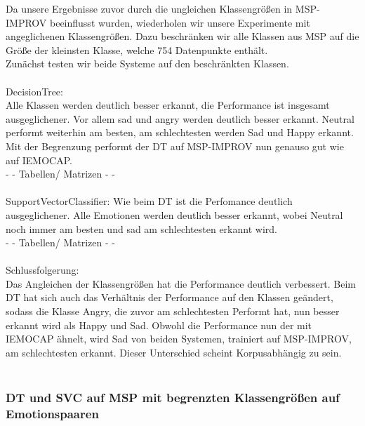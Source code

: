 \documentclass{article} %
\begin{document}
Da unsere Ergebnisse zuvor durch die ungleichen Klassengrößen in MSP-IMPROV beeinflusst wurden, wiederholen wir unsere Experimente mit angeglichenen Klassengrößen. Dazu beschränken wir alle Klassen aus MSP auf die Größe der kleinsten Klasse, welche 754 Datenpunkte enthält. \\
Zunächst testen wir beide Systeme auf den beschränkten Klassen. \\ \\
DecisionTree: \\
Alle Klassen werden deutlich besser erkannt, die Performance ist insgesamt ausgeglichener. Vor allem sad und angry werden deutlich besser erkannt.
Neutral performt weiterhin am besten, am schlechtesten werden Sad und Happy erkannt. Mit der Begrenzung performt der DT auf MSP-IMPROV nun genauso gut wie auf IEMOCAP. \\
- - Tabellen/ Matrizen - - \\ \\
SupportVectorClassifier:
Wie beim DT ist die Perfomance deutlich ausgeglichener. Alle Emotionen werden deutlich besser erkannt, wobei Neutral noch immer am besten und sad am schlechtesten erkannt wird. \\
- - Tabellen/ Matrizen - - \\ \\
Schlussfolgerung: \\
Das Angleichen der Klassengrößen hat die Performance deutlich verbessert.
Beim DT hat sich auch das Verhältnis der Performance auf den Klassen geändert, sodass die Klasse Angry, die zuvor am schlechtesten Performt hat, nun besser erkannt wird als Happy und Sad. Obwohl die Performance nun der mit IEMOCAP ähnelt, wird Sad von beiden Systemen, trainiert auf MSP-IMPROV, am schlechtesten erkannt. Dieser Unterschied scheint Korpusabhängig zu sein. \\ \\

\subsubsection{DT und SVC auf MSP mit begrenzten Klassengrößen auf Emotionspaaren}
\end{document}
